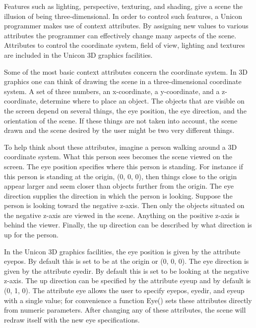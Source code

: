 \documentclass[letterpaper]{article}
\begin{document}
Features such as lighting, perspective, texturing, and shading, give
a scene the illusion of being three-dimensional. In order to control
such features, a Unicon programmer makes use of context attributes.
By assigning new values to various attributes the programmer can
effectively change many aspects of the scene. Attributes to control
the coordinate system, field of view, lighting and textures are
included in the Unicon 3D graphics facilities.

Some of the most basic context attributes concern the coordinate
system. In 3D graphics one can think of drawing the scene in a
three-dimensional coordinate system. A set of three numbers, an
x-coordinate, a y-coordinate, and a z-coordinate, determine where to
place an object. The objects that are visible on the screen depend on
several things, the eye position, the eye direction, and the
orientation of the scene. If these things are not taken into account,
the scene drawn and the scene desired by the user might be two very
different things.

To help think about these attributes, imagine a person walking around
a 3D coordinate system. What this person sees becomes the scene viewed
on the screen. The eye position specifies where this person is
standing. For instance if this person is standing at the origin,
\textsf{(0, 0, 0),} then things close to the origin appear larger and
seem closer than objects further from the origin. The eye direction
supplies the direction in which the person is looking. Suppose the
person is looking toward the negative z-axis. Then only the objects
situated on the negative z-axis are viewed in the scene. Anything on
the positive z-axis is behind the viewer. Finally, the up direction
can be described by what direction is up for the person.

In the Unicon 3D graphics facilities, the eye position is given by the
attribute \textsf{eyepos}. By default this is set to be at the origin
or \textsf{(0, 0, 0)}. The eye direction is given by the attribute
\textsf{eyedir}. By default this is set to be looking at the negative
z-axis. The up direction can be specified by the attribute
\textsf{eyeup} and by default is \textsf{(0, 1, 0)}. The attribute
\textsf{eye} allows the user to specify \textsf{eyepos},
\textsf{eyedir}, and \textsf{eyeup} with a single value; for
convenience a function \textsf{Eye()} sets these attributes directly
from numeric parameters. After changing any of these attributes, the
scene will redraw itself with the new eye specifications.
\end{document}
